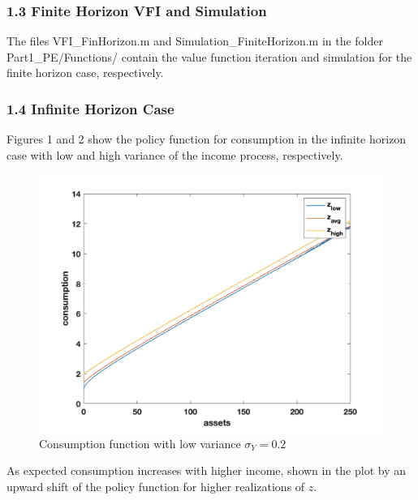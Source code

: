 \documentclass[letterpaper,12pt]{article}
\begin{document}
\subsubsection*{1.3 Finite Horizon VFI and Simulation}
The files VFI\_FinHorizon.m and Simulation\_FiniteHorizon.m in the folder Part1\_PE/Functions/ contain the value function iteration and simulation for the finite horizon case, respectively.




\subsubsection*{1.4 Infinite Horizon Case}
Figures 1 and 2 show the policy function for consumption in the infinite horizon case with low and high variance of the income process, respectively. \\
\begin{figure}
\includegraphics[scale=0.5]{Figures/Part1_PE/consFunc_inf_low}
\caption{Consumption function with low variance $\sigma_Y = 0.2$}
\end{figure}
As expected consumption increases with higher income, shown in the plot by an upward shift of the policy function for higher realizations of $z$. \\
\end{document}
